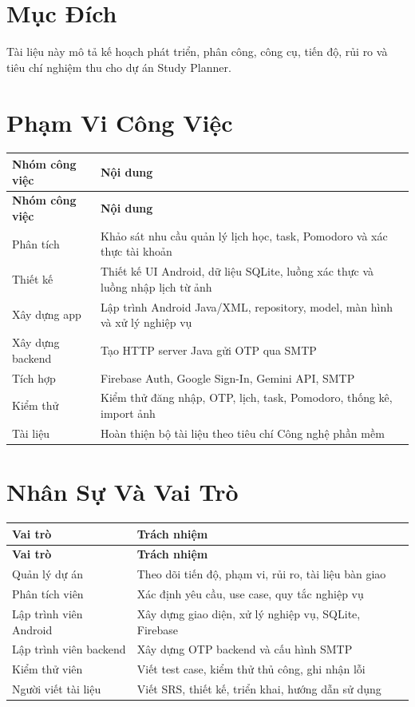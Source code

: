 \documentclass[12pt,a4paper]{report}
\begin{document}
\section{Mục Đích}

Tài liệu này mô tả kế hoạch phát triển, phân công, công cụ, tiến độ, rủi ro và tiêu chí nghiệm thu cho dự án Study Planner.

\section{Phạm Vi Công Việc}

\begin{longtable}{|>{\raggedright\arraybackslash}p{}|>{\raggedright\arraybackslash}p{}|}
\hline
\textbf{Nhóm công việc} & \textbf{Nội dung} \\ \hline
\endfirsthead
\hline
\textbf{Nhóm công việc} & \textbf{Nội dung} \\ \hline
\endhead
Phân tích & Khảo sát nhu cầu quản lý lịch học, task, Pomodoro và xác thực tài khoản \\ \hline
Thiết kế & Thiết kế UI Android, dữ liệu SQLite, luồng xác thực và luồng nhập lịch từ ảnh \\ \hline
Xây dựng app & Lập trình Android Java/XML, repository, model, màn hình và xử lý nghiệp vụ \\ \hline
Xây dựng backend & Tạo HTTP server Java gửi OTP qua SMTP \\ \hline
Tích hợp & Firebase Auth, Google Sign-In, Gemini API, SMTP \\ \hline
Kiểm thử & Kiểm thử đăng nhập, OTP, lịch, task, Pomodoro, thống kê, import ảnh \\ \hline
Tài liệu & Hoàn thiện bộ tài liệu theo tiêu chí Công nghệ phần mềm \\ \hline
\end{longtable}

\section{Nhân Sự Và Vai Trò}

\begin{longtable}{|>{\raggedright\arraybackslash}p{}|>{\raggedright\arraybackslash}p{}|}
\hline
\textbf{Vai trò} & \textbf{Trách nhiệm} \\ \hline
\endfirsthead
\hline
\textbf{Vai trò} & \textbf{Trách nhiệm} \\ \hline
\endhead
Quản lý dự án & Theo dõi tiến độ, phạm vi, rủi ro, tài liệu bàn giao \\ \hline
Phân tích viên & Xác định yêu cầu, use case, quy tắc nghiệp vụ \\ \hline
Lập trình viên Android & Xây dựng giao diện, xử lý nghiệp vụ, SQLite, Firebase \\ \hline
Lập trình viên backend & Xây dựng OTP backend và cấu hình SMTP \\ \hline
Kiểm thử viên & Viết test case, kiểm thử thủ công, ghi nhận lỗi \\ \hline
Người viết tài liệu & Viết SRS, thiết kế, triển khai, hướng dẫn sử dụng \\ \hline
\end{longtable}
\end{document}

